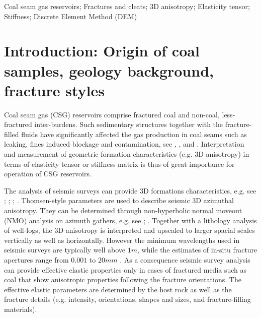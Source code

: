 \documentclass[review,authoryear]{elsarticle}
\begin{document}
\begin{frontmatter}
\begin{abstract}
\end{abstract}


\begin{keyword}
Coal seam gas reservoirs; Fractures and cleats; 3D anisotropy; Elasticity tensor; Stiffness; Discrete Element Method (DEM)
\end{keyword}

\end{frontmatter}

\linenumbers

\section{Introduction: Origin of coal samples, geology background, fracture styles}
Coal seam gas (CSG) reservoirs comprise fractured coal and non-coal, less-fractured inter-burdens. Such sedimentary structures together with the fracture-filled fluids have significantly affected the gas production in coal seams such as leaking, fines induced blockage and contamination, see \cite{thomas1983fractured}, \cite{clarkson2006production}, \cite{golding2013stable} and \cite{flottman2013influence}. Interpretation and measurement of geometric formation characteristics (e.g. 3D anisotropy) in terms of elasticity tensor or stiffness matrix is thus of great importance for operation of CSG reservoirs.

The analysis of seismic surveys can provide 3D formations characteristics, e.g. see \cite{grechka19983}; \cite{schoenberg1995seismic}; \cite{biondi20063d}; \cite{grechka2006effective}. Thomsen-style parameters are used to describe seismic 3D azimuthal anisotropy. They can be determined through non-hyperbolic normal moveout (NMO) analysis on azimuth gathers, e.g. see \cite{vermeer20023}; \cite{tsvankin2011seismology}. Together with a lithology analysis of well-logs, 
the 3D anisotropy is interpreted and upscaled to larger spacial scales vertically as well as horizontally. 
However the minimum  wavelengths used in seismic surveys are typically well above $1 m$, while the estimates of in-situ fracture apertures range from $0.001$ to $20 mm$ \citep{gamson1993coal}. As a consequence seismic survey analysis can provide effective elastic properties only in cases of fractured media such as coal that
show anisotropic properties following the fracture orientations. The effective elastic parameters are determined by the host rock as well 
as the fracture details (e.g. intensity, orientations, shapes and sizes, and fracture-filling materials).
\end{document}

